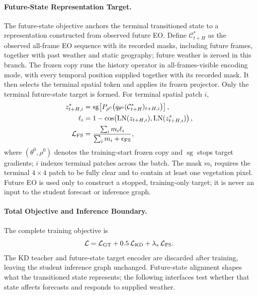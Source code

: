 \documentclass[letterpaper]{article} %
\begin{document}
\paragraph{Future-State Representation Target.}
The future-state objective anchors the terminal transitioned state to a
representation constructed from observed future EO. Define
$\mathcal C^*_{t+H}$ as the observed all-frame EO sequence with its recorded
masks, including future frames, together with past weather and static
geography; future weather is zeroed in this branch. The frozen copy runs the
history operator in all-frames-visible encoding mode, with every temporal
position supplied together with its recorded mask. It then selects the
terminal spatial token and applies its frozen projector. Only the terminal
future-state target is formed. For terminal spatial patch $i$,
\begin{equation}
\begin{aligned}
z^*_{t+H,i}
&=\operatorname{sg}\!\left[
P_{\rho^0}\!\left(
q_{\theta^0}(\mathcal C^*_{t+H})_{t+H,i}\right)\right],\\
\ell_i
&=1-\cos\!\left(
\operatorname{LN}(z_{t+H,i}),
\operatorname{LN}(z^*_{t+H,i})\right),\\
\mathcal L_{\rm FS}
&=\frac{\sum_i m_i\ell_i}{\sum_i m_i+\epsilon_{\rm FS}},
\end{aligned}
\label{eq:futurestate}
\end{equation}
where $(\theta^0,\rho^0)$ denotes the training-start frozen copy and
$\operatorname{sg}$ stops target gradients; $i$ indexes terminal patches
across the batch. The mask $m_i$ requires the terminal $4\times4$ patch to be
fully clear and to contain at least one vegetation pixel. Future EO is used
only to construct a stopped, training-only target; it is never an input to the
student forecast or inference graph.

\paragraph{Total Objective and Inference Boundary.}
The complete training objective is
\begin{equation}
\mathcal L
=\mathcal L_{\mathrm{GT}}
+0.5\,\mathcal L_{\mathrm{KD}}
+\lambda_s\,\mathcal L_{\rm FS}.
\label{eq:total}
\end{equation}
The KD teacher and future-state target encoder are discarded after training,
leaving the student inference graph unchanged. Future-state alignment shapes
what the transitioned state represents; the following interfaces test whether
that state affects forecasts and responds to supplied weather.
\end{document}
